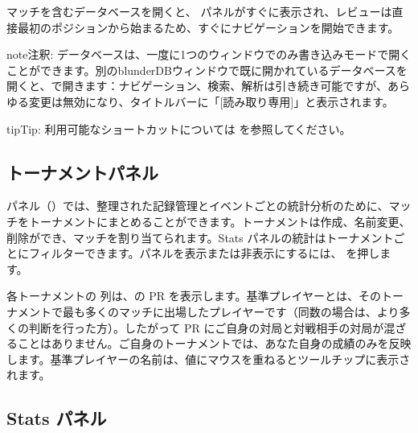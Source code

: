 \documentclass[letterpaper,10pt,dvipdfmx]{sphinxmanual}
\begin{document}
\sphinxAtStartPar
マッチを含むデータベースを開くと、 パネルがすぐに表示され、レビューは直接最初のポジションから始まるため、すぐにナビゲーションを開始できます。

\begin{sphinxadmonition}{note}{注釈:}
\sphinxAtStartPar
データベースは、一度に1つのウィンドウでのみ書き込みモードで開くことができます。別のblunderDBウィンドウで既に開かれているデータベースを開くと、で開きます：ナビゲーション、検索、解析は引き続き可能ですが、あらゆる変更は無効になり、タイトルバーに「{[}読み取り専用{]}」と表示されます。
\end{sphinxadmonition}

\begin{sphinxadmonition}{tip}{Tip:}
\sphinxAtStartPar
利用可能なショートカットについては {\hyperref[\detokenize{raccourcis:raccourcis}]{}} を参照してください。
\end{sphinxadmonition}


\subsection{トーナメントパネル}
\label{\detokenize{manuel:panneau-tournois}}\label{\detokenize{manuel:id8}}
\sphinxAtStartPar
{} パネル（）では、整理された記録管理とイベントごとの統計分析のために、マッチをトーナメントにまとめることができます。トーナメントは作成、名前変更、削除ができ、マッチを割り当てられます。Stats パネルの統計はトーナメントごとにフィルターできます。パネルを表示または非表示にするには、 を押します。

\sphinxAtStartPar
各トーナメントの  列は、の PR を表示します。基準プレイヤーとは、そのトーナメントで最も多くのマッチに出場したプレイヤーです（同数の場合は、より多くの判断を行った方）。したがって PR にご自身の対局と対戦相手の対局が混ざることはありません。ご自身のトーナメントでは、あなた自身の成績のみを反映します。基準プレイヤーの名前は、値にマウスを重ねるとツールチップに表示されます。


\subsection{Stats パネル}
\label{\detokenize{manuel:panneau-stats}}\label{\detokenize{manuel:stats}}
\end{document}
